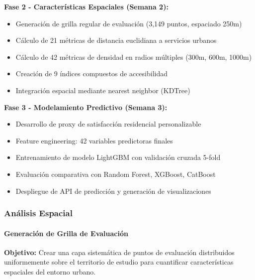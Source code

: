 \textbf{Fase 2 - Características Espaciales (Semana 2):}
\begin{itemize}
    \item Generación de grilla regular de evaluación (3,149 puntos, espaciado 250m)
    \item Cálculo de 21 métricas de distancia euclidiana a servicios urbanos
    \item Cálculo de 42 métricas de densidad en radios múltiples (300m, 600m, 1000m)
    \item Creación de 9 índices compuestos de accesibilidad
    \item Integración espacial mediante nearest neighbor (KDTree)
\end{itemize}

\textbf{Fase 3 - Modelamiento Predictivo (Semana 3):}
\begin{itemize}
    \item Desarrollo de proxy de satisfacción residencial personalizable
    \item Feature engineering: 42 variables predictoras finales
    \item Entrenamiento de modelo LightGBM con validación cruzada 5-fold
    \item Evaluación comparativa con Random Forest, XGBoost, CatBoost
    \item Despliegue de API de predicción y generación de visualizaciones
\end{itemize}

\subsubsection{Análisis Espacial}

\paragraph{Generación de Grilla de Evaluación}

\textbf{Objetivo:} Crear una capa sistemática de puntos de evaluación distribuidos uniformemente sobre el territorio de estudio para cuantificar características espaciales del entorno urbano.

